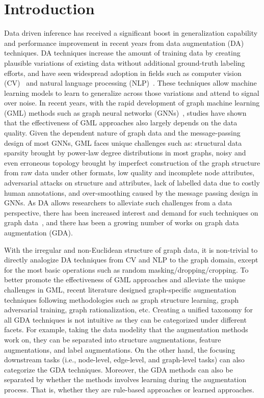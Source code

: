 \documentclass[11pt]{article}
\begin{document}
\section{Introduction}
\label{sec:tong_intro}
\noindent Data driven inference has received a significant boost in generalization capability and performance improvement in recent years from data augmentation (DA) techniques. DA techniques increase the amount of training data by creating plausible variations of existing data without additional ground-truth labeling efforts, and have seen widespread adoption in fields such as computer vision (CV)~\cite{cubuk2019autoaugment} and natural language processing (NLP)~\cite{feng2021survey}. These techniques allow machine learning models to learn to generalize across those variations and attend to signal over noise.
In recent years, with the rapid development of graph machine learning (GML) methods such as graph neural networks (GNNs)~\cite{kipf2016semi,hamilton2017inductive}, studies have shown that the effectiveness of GML approaches also largely depends on the data quality. Given the dependent nature of graph data and the message-passing design of most GNNs, GML faces unique challenges such as: structural data sparsity brought by power-law degree distributions in most graphs, noisy and even erroneous topology brought by imperfect construction of the graph structure from raw data under other formats, low quality and incomplete node attributes, adversarial attacks on structure and attributes, lack of labelled data due to costly human annotations, and over-smoothing caused by the message passing design in GNNs.
As DA allows researchers to alleviate such challenges from a data perspective, there has been increased interest and demand for such techniques on graph data~\cite{zhao2021data}, and there has been a growing number of works on graph data augmentation (GDA).

With the irregular and non-Euclidean structure of graph data, it is non-trivial to directly analogize DA techniques from CV and NLP to the graph domain, except for the most basic operations such as random masking/dropping/cropping. To better promote the effectiveness of GML approaches and alleviate the unique challenges in GML, recent literature designed graph-specific augmentation techniques following methodologies such as graph structure learning, graph adversarial training, graph rationalization, etc.
Creating a unified taxonomy for all GDA techniques is not intuitive as they can be categorized under different facets. 
For example, taking the data modelity that the augmentation methods work on, they can be separated into structure augmentations, feature augmentations, and label augmentations. On the other hand, the focusing downstream tasks (i.e., node-level, edge-level, and graph-level tasks) can also categorize the GDA techniques. Moreover, the GDA methods can also be separated by whether the methods involves learning during the augmentation process. That is, whether they are rule-based approaches or learned approaches.
\end{document}
